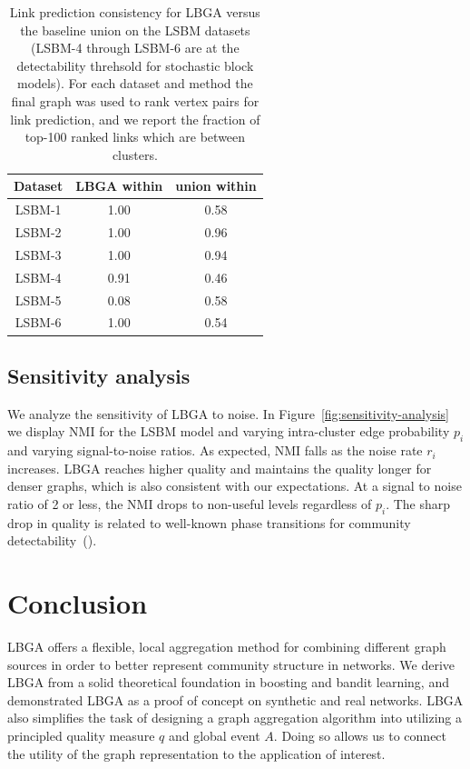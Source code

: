 \documentclass{article}
\begin{document}
\begin{table}
\centering
\begin{tabular}{| c | c c |}
\hline 
Dataset & LBGA within & union within \\ 
\hline
LSBM-1  & 1.00   & 0.58 \\  
LSBM-2  & 1.00   & 0.96 \\  
LSBM-3  & 1.00   & 0.94 \\  
LSBM-4  & 0.91   & 0.46 \\  
LSBM-5  & 0.08   & 0.58 \\  
LSBM-6  & 1.00   & 0.54 \\  
\hline
\end{tabular}
\caption{Link prediction consistency for LBGA versus the baseline union on the
LSBM datasets (LSBM-4 through LSBM-6 are at the detectability threhsold for
stochastic block models). For each dataset and method the final graph was used
to rank vertex pairs for link prediction, and we report the fraction of top-100
ranked links which are between clusters.} 
\label{table:linkprediction}
\end{table}


\subsection{Sensitivity analysis} \label{sec:sensitivity-analysis} 

We analyze the sensitivity of LBGA to noise. In
Figure~\ref{fig:sensitivity-analysis} we display NMI for the LSBM model and
varying intra-cluster edge probability $p_i$ and varying signal-to-noise
ratios. As expected, NMI falls as the noise rate $r_i$ increases. LBGA reaches
higher quality and maintains the quality longer for denser graphs, which is
also consistent with our expectations. At a signal to noise ratio of 2 or less,
the NMI drops to non-useful levels regardless of $p_i$. The sharp drop in
quality is related to well-known phase transitions for community
detectability~(\cite{nadakuditi2012}).

\begin{figure}
\end{figure}
\section{Conclusion}
\label{sec:conclusion}
LBGA offers a flexible, local aggregation method for combining different graph
sources in order to better represent community structure in networks. We derive
LBGA from a solid theoretical foundation in boosting and bandit learning, and
demonstrated LBGA as a proof of concept on synthetic and real networks. LBGA
also simplifies the task of designing a graph aggregation algorithm into
utilizing a principled quality measure $q$ and global event $A$. Doing so
allows us to connect the utility of the graph representation to the application
of interest. 
\end{document}

